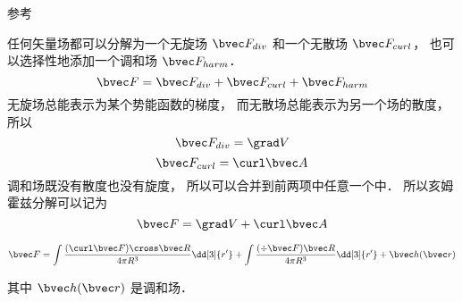 
参考 \cite{GriffE}

任何矢量场都可以分解为一个无旋场 $\bvec F_{div}$ 和一个无散场 $\bvec F_{curl}$， 也可以选择性地添加一个调和场 $\bvec F_{harm}$．
\begin{equation}
\bvec F = \bvec F_{div} + \bvec F_{curl} + \bvec F_{harm}
\end{equation}
无旋场总能表示为某个势能函数的梯度， 而无散场总能表示为另一个场的散度， 所以
\begin{equation}
\bvec F_{div} = \grad V
\end{equation}
\begin{equation}
\bvec F_{curl} = \curl \bvec A
\end{equation}
调和场既没有散度也没有旋度， 所以可以合并到前两项中任意一个中． 所以亥姆霍兹分解可以记为
\begin{equation}
\bvec F = \grad V + \curl \bvec A
\end{equation}

\begin{equation}
\bvec F = \int \frac{(\curl \bvec F)\cross \bvec R}{4\pi R^3} \dd[3]{r'} + \int \frac{(\div \bvec F)\bvec R}{4\pi R^3} \dd[3]{r'} + \bvec h(\bvec r)
\end{equation}

其中 $\bvec h(\bvec r)$ 是调和场．
